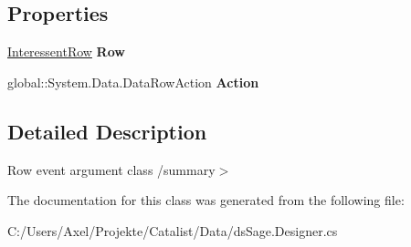 \subsection*{Properties}
\begin{DoxyCompactItemize}
\item 
\hyperlink{class_products_1_1_data_1_1ds_sage_1_1_interessent_row}{Interessent\+Row} {\bfseries Row}\hypertarget{class_products_1_1_data_1_1ds_sage_1_1_interessent_row_change_event_a1f21158f8490327a2dea9d1df3de5926}{}\label{class_products_1_1_data_1_1ds_sage_1_1_interessent_row_change_event_a1f21158f8490327a2dea9d1df3de5926}

\item 
global\+::\+System.\+Data.\+Data\+Row\+Action {\bfseries Action}\hypertarget{class_products_1_1_data_1_1ds_sage_1_1_interessent_row_change_event_a100cafd788650295b39df2f112684d59}{}\label{class_products_1_1_data_1_1ds_sage_1_1_interessent_row_change_event_a100cafd788650295b39df2f112684d59}

\end{DoxyCompactItemize}


\subsection{Detailed Description}
Row event argument class /summary$>$ 

The documentation for this class was generated from the following file\+:\begin{DoxyCompactItemize}
\item 
C\+:/\+Users/\+Axel/\+Projekte/\+Catalist/\+Data/ds\+Sage.\+Designer.\+cs\end{DoxyCompactItemize}
